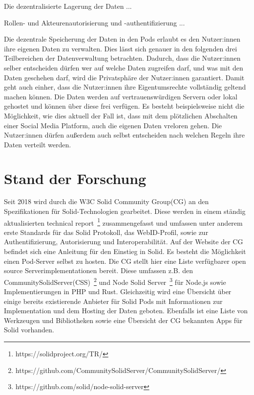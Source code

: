 \documentclass[acmtog]{acmart}
\begin{document}

Die dezentralisierte Lagerung der Daten ... \cite{8633673}

Rollen- und Akteurenautorisierung und -authentifizierung ... \cite{8633673}

Die dezentrale Speicherung der Daten in den Pods erlaubt es den Nutzer:innen ihre eigenen Daten zu verwalten. Dies lässt sich genauer in den folgenden drei Teilbereichen der Datenverwaltung betrachten. Dadurch, dass die Nutzer:innen selber entscheiden dürfen wer auf welche Daten zugreifen darf, und was mit den Daten geschehen darf, wird die Privatsphäre der Nutzer:innen garantiert. Damit geht auch einher, dass die Nutzer:innen ihre Eigentumsrechte vollständig geltend machen können. Die Daten werden auf vertrauenswürdigen Servern oder lokal gehostet und können über diese frei verfügen. Es besteht beispielsweise nicht die Möglichkeit, wie dies aktuell der Fall ist, dass mit dem plötzlichen Abschalten einer Social Media Platform, auch die eigenen Daten vreloren gehen. Die Nutzer:innen dürfen außerdem auch selbst entscheiden nach welchen Regeln ihre Daten verteilt werden. \cite{yeung2023decentralization}


\label{section:standDerForschung}
\section{Stand der Forschung}
Seit 2018 wird durch die W3C Solid Community Group(CG) an den Spezifikationen für Solid-Technologien gearbeitet. 
Diese werden in einem ständig aktualisierten technical report~\footnote{https://solidproject.org/TR/} zusammengefasst und umfassen unter anderem erste Standards für das Solid Protokoll, das WebID-Profil, sowie zur Authentifizierung, Autorisierung und Interoperabilität. 
Auf der Website der CG befindet sich eine Anleitung für den Einstieg in Solid. Es besteht die Möglichkeit einen Pod-Server selbst zu hosten. Die CG stellt hier eine Liste verfügbarer open source Serverimplementationen bereit. Diese umfassen z.B. den CommunitySolidServer(CSS)~\footnote{https://github.com/CommunitySolidServer/CommunitySolidServer/} und Node Solid Server~\footnote{https://github.com/solid/node-solid-server} für Node.js sowie Implementierungen in PHP und Rust.
Gleichzeitig wird eine Übersicht über einige bereits existierende Anbieter für Solid Pods mit Informationen zur Implementation und dem Hosting der Daten geboten.
Ebenfalls ist eine Liste von Werkzeugen und Bibliotheken sowie eine Übersicht der CG bekannten Apps für Solid vorhanden.
\end{document}
